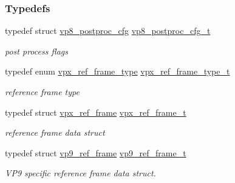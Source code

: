 \subsubsection*{\-Typedefs}
\begin{DoxyCompactItemize}
\item 
typedef struct \hyperlink{structvp8__postproc__cfg}{vp8\-\_\-postproc\-\_\-cfg} \hyperlink{group__vp8_ga7e9e955211711b2f915bc59640cc0ef0}{vp8\-\_\-postproc\-\_\-cfg\-\_\-t}
\begin{DoxyCompactList}\small\item\em post process flags \end{DoxyCompactList}\item 
typedef enum \hyperlink{group__vp8_gad8ab72d8a178a68339dad2987358c331}{vpx\-\_\-ref\-\_\-frame\-\_\-type} \hyperlink{group__vp8_ga75ac0689a81bf7202382a225c5b451b4}{vpx\-\_\-ref\-\_\-frame\-\_\-type\-\_\-t}
\begin{DoxyCompactList}\small\item\em reference frame type \end{DoxyCompactList}\item 
typedef struct \hyperlink{structvpx__ref__frame}{vpx\-\_\-ref\-\_\-frame} \hyperlink{group__vp8_ga9157c53799cdafd12ebee65d04e16825}{vpx\-\_\-ref\-\_\-frame\-\_\-t}
\begin{DoxyCompactList}\small\item\em reference frame data struct \end{DoxyCompactList}\item 
typedef struct \hyperlink{structvp9__ref__frame}{vp9\-\_\-ref\-\_\-frame} \hyperlink{group__vp8_gab0371044ac07cca814583624b6776005}{vp9\-\_\-ref\-\_\-frame\-\_\-t}
\begin{DoxyCompactList}\small\item\em \-V\-P9 specific reference frame data struct. \end{DoxyCompactList}\end{DoxyCompactItemize}
